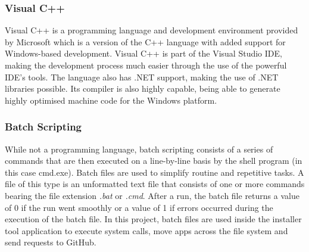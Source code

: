 \subsubsection{Visual C++}
Visual C++ is a programming language and development environment provided by Microsoft which is a version of the C++ language with added support for Windows-based development. Visual C++ is part of the Visual Studio IDE, making the development process much easier through the use of the powerful IDE's tools. The language also has .NET support, making the use of .NET libraries possible. Its compiler is also highly capable, being able to generate highly optimised machine code for the Windows platform.

\subsubsection{Batch Scripting}
While not a programming language, batch scripting consists of a series of commands that are then executed on a line-by-line basis by the shell program (in this case cmd.exe). Batch files are used to simplify routine and repetitive tasks. A file of this type is an unformatted text file that consists of one or more commands bearing the file extension \textit{.bat} or \textit{.cmd}. After a run, the batch file returns a value of 0 if the run went smoothly or a value of 1 if errors occurred during the execution of the batch file\cite{batch_files}. In this project, batch files are used inside the installer tool application to execute system calls, move apps across the file system and send requests to GitHub.
\vspace{\baselineskip}\newline


